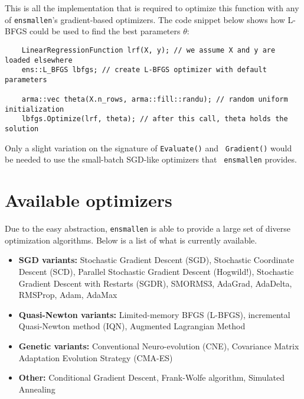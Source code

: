 \documentclass{article}
\begin{document}
This is all the implementation that is required to optimize this function with
any of {\tt ensmallen}'s gradient-based optimizers.  The code snippet below
shows how L-BFGS could be used to find the best parameters $\theta$:

\vspace*{-0.4em}
\begin{verbatim}
    LinearRegressionFunction lrf(X, y); // we assume X and y are loaded elsewhere
    ens::L_BFGS lbfgs; // create L-BFGS optimizer with default parameters

    arma::vec theta(X.n_rows, arma::fill::randu); // random uniform initialization
    lbfgs.Optimize(lrf, theta); // after this call, theta holds the solution
\end{verbatim}
\vspace*{-0.4em}

Only a slight variation on the signature of {\tt Evaluate()} and {\tt
Gradient()} would be needed to use the small-batch SGD-like optimizers that {\tt
ensmallen} provides.

\vspace*{-0.3em}
\section{Available optimizers}
\vspace*{-0.5em}

Due to the easy abstraction, {\tt ensmallen} is able to provide a large set of
diverse optimization algorithms.  Below is a list of what is currently
available.

\vspace*{-0.4em}
\begin{itemize}
  \item {\bf SGD variants:} Stochastic Gradient Descent (SGD), Stochastic
      Coordinate Descent (SCD), Parallel Stochastic Gradient Descent (Hogwild!),
      Stochastic Gradient Descent with Restarts (SGDR), SMORMS3, AdaGrad,
      AdaDelta, RMSProp, Adam, AdaMax

  \item {\bf Quasi-Newton variants:} Limited-memory BFGS (L-BFGS), incremental
        Quasi-Newton method (IQN), Augmented Lagrangian Method

  \item {\bf Genetic variants:} Conventional Neuro-evolution (CNE), Covariance
        Matrix Adaptation Evolution Strategy (CMA-ES)

  \item {\bf Other:} Conditional Gradient Descent, Frank-Wolfe algorithm, Simulated Annealing

\end{itemize}
\vspace*{-0.4em}
\end{document}

